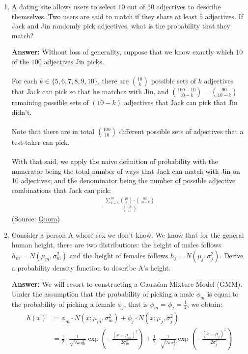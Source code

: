 \documentclass{article}
\newenvironment{QandA}{\begin{enumerate}[label=\arabic*.]}{\end{enumerate}}
\newenvironment{answer}{\par\normalfont \textbf{Answer:}}{}
\begin{document}
\begin{QandA}
    \item A dating site allows users to select $10$ out of $50$ adjectives to describe themselves. Two users are said to match if they share at least $5$ adjectives. If Jack and Jin randomly pick adjectives, what is the probability that they match?
    \begin{answer}
        Without loss of generality, suppose that we know exactly which $10$ of the $100$ adjectives Jin picks.\\\\
        For each $k \in \{5, 6, 7, 8, 9, 10\}$, there are ${10 \choose k}$  possible sets of $k$ adjectives that Jack can pick so that he matches with Jin, and ${100-10 \choose 10-k} = {90 \choose 10-k}$ remaining possible sets of $(10-k)$ adjectives that Jack can pick that Jin didn't. \\\\
        Note that there are in total ${100 \choose 10}$ different possible sets of adjectives that a test-taker can pick. \\\\
        With that said, we apply the naive definition of probability with the numerator being the total number of ways that Jack can match with Jin on 10 adjectives; and the denominator being the number of possible adjective combinations that Jack can pick:
        \begin{align*}
            \frac{\sum_{k=5}^{10} {10 \choose k} \cdot {90 \choose 10-k}}{{100 \choose 10}}
        \end{align*}
        (Source: \href{https://www.quora.com/On-a-dating-site-users-can-select-5-out-of-24-adjectives-to-describe-themselves-A-match-is-declared-between-two-users-if-they-match-on-at-least-4-adjectives-If-Alice-and-Bob-randomly-pick-adjectives-what-is-the-probability-that-they-will-form-a-match/answer/William-Chen-6?ch=10&oid=8079414&share=54d36e1b&srid=RbHjN&target_type=answer}{Quora})
    \end{answer}

    \item Consider a person A whose sex we don’t know. We know that for the general human height, there are two distributions: the height of males follows $h_m = N(\mu_m, \sigma_m^2)$ and the height of females follows  $h_j=N(\mu_j, \sigma_j^2)$. Derive a probability density function to describe A’s height.
    \begin{answer}
        We will resort to constructing a Gaussian Mixture Model (GMM). Under the assumption that the probability of picking a male $\phi_m$ is equal to the probability of picking a female $\phi_j$, that is $\phi_m=\phi_j=\frac{1}{2}$, we obtain:
        \begin{align*}
            h(x) &= \phi_m \cdot N(x; \mu_m, \sigma_m^2) + \phi_j \cdot N(x; \mu_j, \sigma_j^2) \\ 
            &= \frac{1}{2}\cdot \frac{1}{\sqrt{2\pi\sigma_m^2}}\exp\left(-\frac{(x-\mu_m)^2}{2\sigma_m^2} \right) + \frac{1}{2}\cdot \frac{1}{\sqrt{2\pi\sigma_j^2}}\exp\left(-\frac{(x-\mu_j)^2}{2\sigma_j^2} \right)
        \end{align*}
    \end{answer}


\end{QandA}
\end{document}
